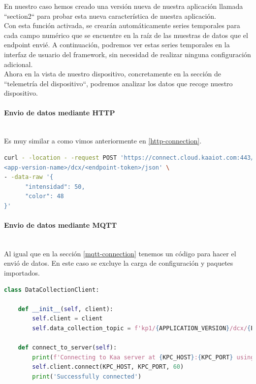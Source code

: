 {En nuestro caso hemos creado una versión nueva de nuestra aplicación llamada ``section2`` para probar esta nueva característica de nuestra aplicación. \\

Con esta función activada, se crearán automáticamente series temporales para cada campo numérico que se encuentre en la raíz de las muestras de datos que el endpoint envié. A continuación, podremos ver estas series temporales en la interfaz de usuario del framework, sin necesidad de realizar ninguna configuración adicional. \\

Ahora en la vista de nuestro dispositivo, concretamente en la sección de ``telemetría del dispositivo``, podremos analizar los datos que recoge nuestro dispositivo.

\paragraph{Envio de datos mediante HTTP} \hspace{0pt} \\

Es muy similar a como vimos anteriormente en \ref{http-connection}.

\begin{lstlisting}[language=bash]
curl - -location - -request POST 'https://connect.cloud.kaaiot.com:443/kp1/
<app-version-name>/dcx/<endpoint-token>/json' \
- -data-raw '{
      "intensidad": 50,
      "color": 48
}'
\end{lstlisting}



\paragraph{Envio de datos mediante MQTT} \hspace{0pt} \\

Al igual que en la sección \ref{mqtt-connection} tenemos un código para hacer el envió de datos. En este caso se excluye la carga de configuración y paquetes importados.

\begin{lstlisting}[language=Python]
class DataCollectionClient:

    def __init__(self, client):
        self.client = client
        self.data_collection_topic = f'kp1/{APPLICATION_VERSION}/dcx/{ENDPOINT_TOKEN}/json'

    def connect_to_server(self):
        print(f'Connecting to Kaa server at {KPC_HOST}:{KPC_PORT} using application version {APPLICATION_VERSION} and endpoint token {ENDPOINT_TOKEN}')
        self.client.connect(KPC_HOST, KPC_PORT, 60)
        print('Successfully connected')


\end{lstlisting}}
